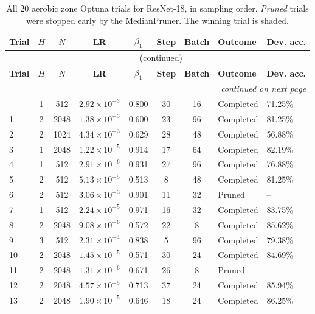 {\footnotesize
\begin{longtable}{lccccccll}
\caption{All 20 aerobic zone Optuna trials for ResNet-18, in sampling order. \emph{Pruned} trials were stopped early by the MedianPruner. The winning trial is shaded.}
\label{tab:trials_aerobic_resnet18} \\
\toprule
\textbf{Trial} & \textbf{$H$} & \textbf{$N$} & \textbf{LR} & \textbf{$\beta_1$} & \textbf{Step} & \textbf{Batch} & \textbf{Outcome} & \textbf{Dev. acc.} \\
\midrule
\endfirsthead
\multicolumn{9}{c}{\tablename\ \thetable{} (continued)} \\
\toprule
\textbf{Trial} & \textbf{$H$} & \textbf{$N$} & \textbf{LR} & \textbf{$\beta_1$} & \textbf{Step} & \textbf{Batch} & \textbf{Outcome} & \textbf{Dev. acc.} \\
\midrule
\endhead
\midrule
\multicolumn{9}{r}{\emph{continued on next page}} \\
\endfoot
\bottomrule
\endlastfoot
0 & 1 & 512 & $2.92\times10^{-3}$ & 0.800 & 30 & 16 & Completed & 71.25\% \\
1 & 2 & 2048 & $1.38\times10^{-3}$ & 0.600 & 23 & 96 & Completed & 81.25\% \\
2 & 2 & 1024 & $4.34\times10^{-3}$ & 0.629 & 28 & 48 & Completed & 56.88\% \\
3 & 1 & 2048 & $1.22\times10^{-5}$ & 0.914 & 17 & 64 & Completed & 82.19\% \\
4 & 1 & 512 & $2.91\times10^{-6}$ & 0.931 & 27 & 96 & Completed & 76.88\% \\
5 & 2 & 512 & $5.13\times10^{-5}$ & 0.513 & 8 & 48 & Completed & 81.25\% \\
6 & 2 & 512 & $3.06\times10^{-3}$ & 0.901 & 11 & 32 & Pruned & -- \\
7 & 1 & 512 & $2.24\times10^{-5}$ & 0.971 & 16 & 32 & Completed & 83.75\% \\
8 & 2 & 2048 & $9.08\times10^{-6}$ & 0.572 & 22 & 8 & Completed & 85.62\% \\
9 & 3 & 512 & $2.31\times10^{-4}$ & 0.838 & 5 & 96 & Completed & 79.38\% \\
10 & 2 & 2048 & $1.45\times10^{-5}$ & 0.571 & 30 & 24 & Completed & 84.69\% \\
11 & 2 & 2048 & $1.31\times10^{-6}$ & 0.671 & 26 & 8 & Pruned & -- \\
12 & 2 & 2048 & $4.57\times10^{-5}$ & 0.713 & 37 & 24 & Completed & 85.94\% \\
13 & 2 & 2048 & $1.90\times10^{-5}$ & 0.646 & 18 & 24 & Completed & 86.25\% \\

\end{longtable}}

